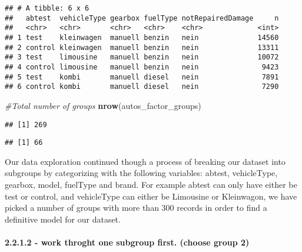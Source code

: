\documentclass[]{article}
\newenvironment{Shaded}{\begin{snugshade}}{\end{snugshade}}
\newcommand{\CommentTok}[1]{\textcolor[rgb]{0.56,0.35,0.01}{\textit{#1}}}
\newcommand{\DecValTok}[1]{\textcolor[rgb]{0.00,0.00,0.81}{#1}}
\newcommand{\KeywordTok}[1]{\textcolor[rgb]{0.13,0.29,0.53}{\textbf{#1}}}
\newcommand{\NormalTok}[1]{#1}
\newcommand{\OperatorTok}[1]{\textcolor[rgb]{0.81,0.36,0.00}{\textbf{#1}}}
\let\oldparagraph\paragraph
\renewcommand{\paragraph}[1]{\oldparagraph{#1}\mbox{}}
\begin{document}
\begin{verbatim}
## # A tibble: 6 x 6
##   abtest  vehicleType gearbox fuelType notRepairedDamage     n
##   <chr>   <chr>       <chr>   <chr>    <chr>             <int>
## 1 test    kleinwagen  manuell benzin   nein              14560
## 2 control kleinwagen  manuell benzin   nein              13311
## 3 test    limousine   manuell benzin   nein              10072
## 4 control limousine   manuell benzin   nein               9423
## 5 test    kombi       manuell diesel   nein               7891
## 6 control kombi       manuell diesel   nein               7290
\end{verbatim}

\begin{Shaded}
\begin{Highlighting}[]
\CommentTok{#Total number of groups}
\KeywordTok{nrow}\NormalTok{(autos_factor_groups)}
\end{Highlighting}
\end{Shaded}

\begin{verbatim}
## [1] 269
\end{verbatim}

\begin{Shaded}
\end{Shaded}

\begin{verbatim}
## [1] 66
\end{verbatim}

Our data exploration continued though a process of breaking our dataset
into subgroups by categorizing with the following variables: abtest,
vehicleType, gearbox, model, fuelType and brand. For example abtest can
only have either be test or control, and vehicleType can either be
Limousine or Kleinwagon, we have picked a number of groups with more
than 300 records in order to find a definitive model for our dataset.

\hypertarget{work-throght-one-subgroup-first.-choose-group-2}{%
\paragraph{2.2.1.2 - work throght one subgroup first. (choose group
2)}\label{work-throght-one-subgroup-first.-choose-group-2}}
\end{document}

